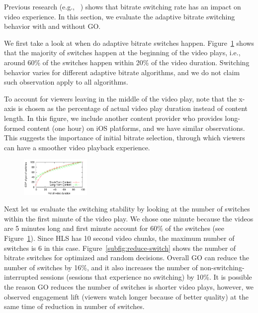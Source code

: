 


\label{subsec:adaptive-bitrate}

Previous research (e.g., ~\cite{user-adaptive,videoqoe}) shows that bitrate switching rate has an impact on video experience. In this section, we evaluate the adaptive 
bitrate switching behavior with and without GO. 

We first take a look at when do adaptive bitrate switches happen. Figure~\ref{fig:switch-time-dist} shows that the 
majority of switches happen at the beginning of the video plays, i.e., around 60\% of the switches 
happen within 20\% of the video duration. Switching behavior varies for different adaptive bitrate algorithms, and we do not 
claim such observation apply to all algorithms.

To account for viewers leaving in the middle of the video play, note that the x-axis is chosen as the percentage of actual 
video play duration instead of content length. 
In this figure, we include another content provider who provides long-formed content (one hour) on iOS platforms, and we have similar observations. This suggests the importance of initial bitrate selection, through which viewers can have a smoother video playback experience.

\begin{figure}[h!]
\centering
 \includegraphics[width=0.3\textwidth] {figures/switch-time-dist.pdf}
\label{fig:switch-time-dist}
\end{figure}



Next let us evaluate the switching stability by looking at the number of switches within the first minute of the video play.
We chose one minute because the videos are 5 minutes long and first minute account for 60\% of the switches (see Figure~\ref{fig:switch-time-dist}). 
Since HLS has 10 second video chunks, the maximum number of switches is 6 in this case.
Figure~\ref{subfig:reduce-switch} shows the number of bitrate switches for optimized and random decisions. 
Overall GO can reduce the number of switches by 16\%, and it also increases the number of non-switching-interrupted sessions 
(sessions that experience no switching) by 10\%.
It is possible the reason GO reduces the number of switches is shorter video plays, however, we observed engagement lift
(viewers watch longer because of better quality) at the same time of reduction in number of switches.



